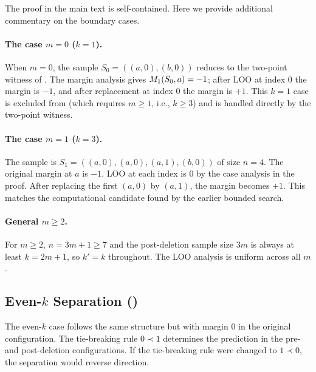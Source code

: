 The proof in the main text is self-contained.  Here we provide additional
commentary on the boundary cases.

\paragraph{The case $m = 0$ ($k = 1$).}
When $m = 0$, the sample $S_0 = ((a,0), (b,0))$ reduces to the two-point
witness of .  The margin analysis gives
$M_1(S_0,a) = -1$; after LOO at index $0$ the margin is $-1$, and after
replacement at index $0$ the margin is $+1$.  This $k=1$ case is excluded from
 (which requires $m \ge 1$, i.e., $k \ge 3$) and is
handled directly by the two-point witness.

\paragraph{The case $m = 1$ ($k = 3$).}
The sample is $S_1 = ((a,0), (a,0), (a,1), (b,0))$ of size $n=4$.  The original
margin at $a$ is $-1$.  LOO at each index is $0$ by the case analysis in the
proof.  After replacing the first $(a,0)$ by $(a,1)$, the margin becomes $+1$.
This matches the computational candidate found by the earlier bounded search.

\paragraph{General $m \ge 2$.}
For $m \ge 2$, $n = 3m+1 \ge 7$ and the post-deletion sample size $3m$ is
always at least $k = 2m+1$, so $k' = k$ throughout.  The LOO analysis is
uniform across all $m$.

\subsection{Even-$k$ Separation ()}

The even-$k$ case follows the same structure but with margin $0$ in the
original configuration.  The tie-breaking rule $0 \prec 1$ determines the
prediction in the pre- and post-deletion configurations.  If the tie-breaking
rule were changed to $1 \prec 0$, the separation would reverse direction.

